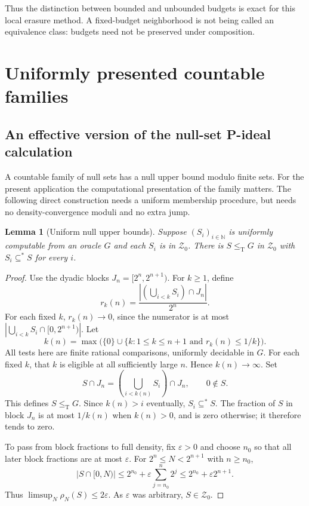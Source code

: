 \documentclass[11pt,a4paper]{article}
\newcommand{\N}{\mathbb N}
\newcommand{\leT}{\leq_{\mathrm T}}
\newcommand{\Znull}{\mathcal Z_0}
\newcommand{\substar}{\subseteq^{*}}
\newtheorem{lemma}[theorem]{Lemma}
\theoremstyle{definition}
\theoremstyle{remark}
\begin{document}
Thus the distinction between bounded and unbounded budgets is exact for
this local erasure method. A fixed-budget neighborhood is not being called
an equivalence class: budgets need not be preserved under composition.

\section{Uniformly presented countable families}
\label{cr14:sec:countable}
\subsection{An effective version of the null-set P-ideal calculation}
A countable family of null sets has a null upper bound modulo finite sets.
For the present application the computational presentation of the family
matters. The following direct construction needs a uniform membership
procedure, but needs no density-convergence moduli and no extra jump.

\begin{lemma}[Uniform null upper bounds]\label{cr14:lem:Pideal}
Suppose $(S_i)_{i\in\N}$ is uniformly computable from an oracle $G$ and
each $S_i$ is in $\Znull$. There is $S\leT G$ in $\Znull$ with
$S_i\substar S$ for every $i$.
\end{lemma}
\begin{proof}
Use the dyadic blocks $J_n=[2^n,2^{n+1})$. For $k\geq1$, define
\[
 r_k(n)=\frac{|(\bigcup_{i<k}S_i)\cap J_n|}{2^n}.
\]
For each fixed $k$, $r_k(n)\to0$, since the numerator is at most
$|\bigcup_{i<k}S_i\cap[0,2^{n+1})|$. Let
\[
 k(n)=\max\bigl(\{0\}\cup
     \{k:1\leq k\leq n+1\text{ and }r_k(n)\leq1/k\}\bigr).
\]
All tests here are finite rational comparisons, uniformly decidable in
$G$. For each fixed $k$, that $k$ is eligible at all sufficiently large
$n$. Hence $k(n)\to\infty$. Set
\[
 S\cap J_n=\left(\bigcup_{i<k(n)}S_i\right)\cap J_n,
 \qquad 0\notin S.
\]
This defines $S\leT G$. Since $k(n)>i$ eventually, $S_i\substar S$.
The fraction of $S$ in block $J_n$ is at most $1/k(n)$ when $k(n)>0$,
and is zero otherwise; it therefore tends to zero.

To pass from block fractions to full density, fix $\varepsilon>0$ and
choose $n_0$ so that all later block fractions are at most $\varepsilon$.
For $2^n\leq N<2^{n+1}$ with $n\geq n_0$,
\[
 |S\cap[0,N)|\leq 2^{n_0}
       +\varepsilon\sum_{j=n_0}^{n}2^j
 \leq 2^{n_0}+\varepsilon 2^{n+1}.
\]
Thus $\limsup_N\rho_N(S)\leq2\varepsilon$.
As $\varepsilon$ was arbitrary, $S\in\Znull$.
\end{proof}
\end{document}
